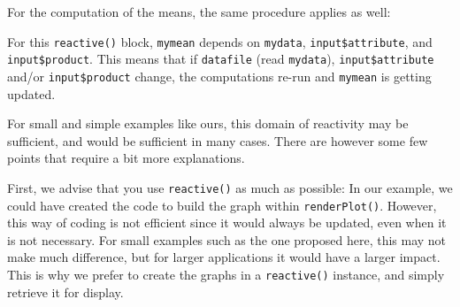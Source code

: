 \documentclass[
]{krantz}
\makeatletter
\newenvironment{Shaded}{\begin{snugshade}}{\end{snugshade}}
\newcommand{\AttributeTok}[1]{\textcolor[rgb]{0.61,0.61,0.61}{#1}}
\newcommand{\DecValTok}[1]{\textcolor[rgb]{0.06,0.06,0.06}{#1}}
\newcommand{\FunctionTok}[1]{\textcolor[rgb]{0,0,0}{#1}}
\newcommand{\NormalTok}[1]{#1}
\newcommand{\OtherTok}[1]{\textcolor[rgb]{0.37,0.37,0.37}{#1}}
\newcommand{\SpecialCharTok}[1]{\textcolor[rgb]{0,0,0}{#1}}
\newcommand{\StringTok}[1]{\textcolor[rgb]{0.5,0.5,0.5}{#1}}
\newenvironment{kframe}{%
\medskip{}
\setlength{\fboxsep}{.8em}
 \def\at@end@of@kframe{}%
 \ifinner\ifhmode%
  \def\at@end@of@kframe{\end{minipage}}%
  \begin{minipage}{\columnwidth}%
 \fi\fi%
 \def\FrameCommand##1{\hskip\@totalleftmargin \hskip-\fboxsep
 \colorbox{shadecolor}{##1}\hskip-\fboxsep
     \hskip-\linewidth \hskip-\@totalleftmargin \hskip\columnwidth}%
 \MakeFramed {\advance\hsize-\width
   \@totalleftmargin\z@ \linewidth\hsize
   \@setminipage}}%
 {\par\unskip\endMakeFramed%
 \at@end@of@kframe}
\renewenvironment{Shaded}{\begin{kframe}}{\end{kframe}}
\makeatother
\begin{document}
For the computation of the means, the same procedure applies as well:

\begin{Shaded}
\end{Shaded}

For this \texttt{reactive()} block, \texttt{mymean} depends on \texttt{mydata}, \texttt{input\$attribute}, and \texttt{input\$product}. This means that if \texttt{datafile} (read \texttt{mydata}), \texttt{input\$attribute} and/or \texttt{input\$product} change, the computations re-run and \texttt{mymean} is getting updated.

For small and simple examples like ours, this domain of reactivity may be sufficient, and would be sufficient in many cases. There are however some few points that require a bit more explanations.

First, we advise that you use \texttt{reactive()} as much as possible: In our example, we could have created the code to build the graph within \texttt{renderPlot()}. However, this way of coding is not efficient since it would always be updated, even when it is not necessary. For small examples such as the one proposed here, this may not make much difference, but for larger applications it would have a larger impact. This is why we prefer to create the graphs in a \texttt{reactive()} instance, and simply retrieve it for display.
\end{document}
